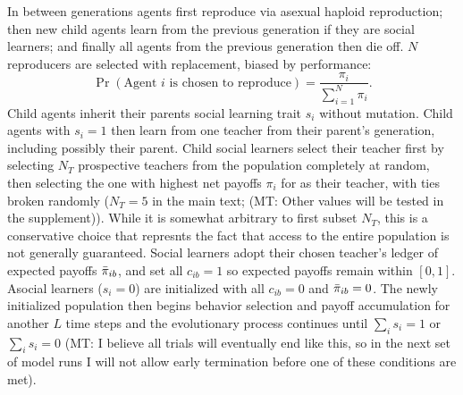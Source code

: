 \documentclass[letterpaper,11.5pt]{scrartcl}
\newcommand{\mt}[1]{{\textcolor{myorange} {({\tiny MT:} #1)}}}
\begin{document}
In between generations agents first reproduce via asexual haploid reproduction; 
then new child agents learn from the
previous generation if they are social learners; and finally all agents from the
previous generation then die off. $N$ reproducers are selected with replacement, 
biased by performance:
\begin{equation}
  \Pr(\text{Agent $i$ is chosen to reproduce}) = \frac{\pi_i}{\sum_{i=1}^N \pi_i}.
\end{equation}
\noindent
Child agents inherit their parents social learning trait $s_i$ without mutation.
Child agents with $s_i = 1$ then learn from one teacher from their parent's
generation, including possibly their parent. Child social learners select
their teacher first by selecting $N_T$ prospective teachers from the 
population completely at random, then selecting the one with highest
net payoffs $\pi_i$ for as their teacher, with ties broken randomly 
($N_T = 5$ in the main text;
\mt{Other values will be tested in the supplement}). While it is somewhat
arbitrary to first subset $N_T$, this is a conservative choice that
represnts the fact that access to the entire population is not generally
guaranteed. Social learners adopt their chosen teacher's ledger of 
expected payoffs $\bar\pi_{ib}$, and set
all $c_{ib} = 1$ so expected payoffs remain within $[0, 1]$. 
Asocial learners ($s_i = 0$) are initialized with all $c_{ib} = 0$ and
$\bar\pi_{ib} = 0$. The newly initialized population then begins behavior selection
and payoff accumulation for another $L$ time steps and the evolutionary process
continues until $\sum_i s_i = 1$ or $\sum_i s_i = 0$ \mt{I believe
all trials will eventually end like this, so in the next set of model runs I will
not allow early termination before one of these conditions are met}.
\end{document}
